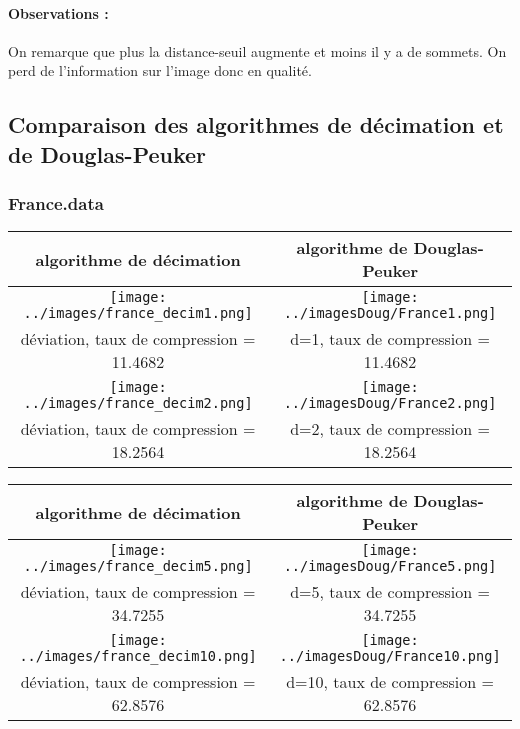 \documentclass[11pt,a4paper]{article}
\begin{document}
\paragraph{Observations :}
On remarque que plus la distance-seuil augmente et moins il y a de sommets. On perd de l'information sur l'image donc
en qualité.

\subsection{Comparaison des algorithmes de décimation et de Douglas-Peuker}
\subsubsection{France.data}


\begin{center}
 \begin{tabular}{|c|c|}
\hline
algorithme de décimation & algorithme de Douglas-Peuker \\
\hline
 \texttt{[image: ../images/france\_decim1.png]} & \texttt{[image: ../imagesDoug/France1.png]} \\
déviation, taux de compression = 11.4682   &  d=1, taux de compression = 11.4682  \\
\hline
 \texttt{[image: ../images/france\_decim2.png]} & \texttt{[image: ../imagesDoug/France2.png]} \\
déviation, taux de compression = 18.2564   & d=2, taux de compression = 18.2564  \\
\hline
 \end{tabular}
 \end{center}

\begin{center}
 \begin{tabular}{|c|c|}
\hline
algorithme de décimation & algorithme de Douglas-Peuker \\
\hline
 \texttt{[image: ../images/france\_decim5.png]} & \texttt{[image: ../imagesDoug/France5.png]} \\
déviation, taux de compression = 34.7255   &  d=5, taux de compression = 34.7255  \\
\hline
 \texttt{[image: ../images/france\_decim10.png]} & \texttt{[image: ../imagesDoug/France10.png]} \\
déviation, taux de compression = 62.8576 & d=10, taux de compression = 62.8576 \\
\hline
 \end{tabular}
 \end{center}
\end{document}
